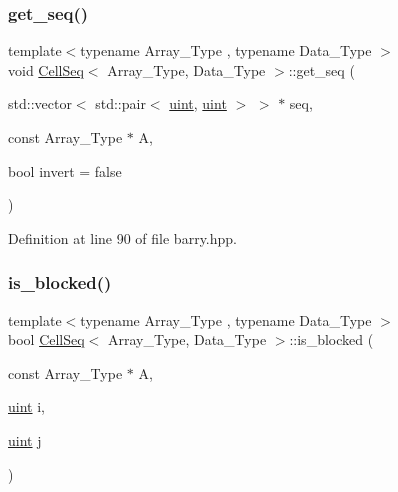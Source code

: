 \subsubsection{\texorpdfstring{get\+\_\+seq()}{get\_seq()}}
{\footnotesize\ttfamily template$<$typename Array\+\_\+\+Type , typename Data\+\_\+\+Type $>$ \\
void \hyperlink{classbarry_1_1_cell_seq}{Cell\+Seq}$<$ Array\+\_\+\+Type, Data\+\_\+\+Type $>$\+::get\+\_\+seq (\begin{DoxyParamCaption}\item[{std\+::vector$<$ std\+::pair$<$ \hyperlink{namespacebarry_a11dfc53ddb4672278319aa04f1e09a6c}{uint}, \hyperlink{namespacebarry_a11dfc53ddb4672278319aa04f1e09a6c}{uint} $>$ $>$ $\ast$}]{seq,  }\item[{const Array\+\_\+\+Type $\ast$}]{A,  }\item[{bool}]{invert = {\ttfamily false} }\end{DoxyParamCaption})\hspace{0.3cm}{\ttfamily [inline]}}



Definition at line 90 of file barry.\+hpp.

\mbox{\label{classbarry_1_1_cell_seq_a32d85d2f118a68b58d1f7a6095ff42ca}} 
\subsubsection{\texorpdfstring{is\+\_\+blocked()}{is\_blocked()}}
{\footnotesize\ttfamily template$<$typename Array\+\_\+\+Type , typename Data\+\_\+\+Type $>$ \\
bool \hyperlink{classbarry_1_1_cell_seq}{Cell\+Seq}$<$ Array\+\_\+\+Type, Data\+\_\+\+Type $>$\+::is\+\_\+blocked (\begin{DoxyParamCaption}\item[{const Array\+\_\+\+Type $\ast$}]{A,  }\item[{\hyperlink{namespacebarry_a11dfc53ddb4672278319aa04f1e09a6c}{uint}}]{i,  }\item[{\hyperlink{namespacebarry_a11dfc53ddb4672278319aa04f1e09a6c}{uint}}]{j }\end{DoxyParamCaption})\hspace{0.3cm}{\ttfamily [inline]}}



